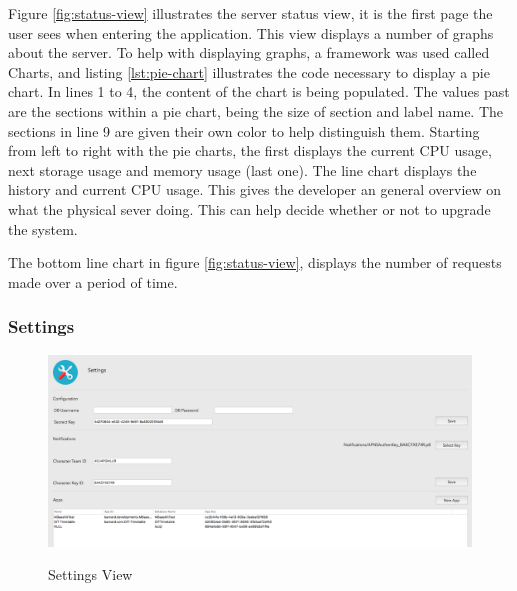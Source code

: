 Figure \ref{fig:status-view} illustrates the server status view, it is the first page the user sees when entering the application. This view displays a number of graphs about the server. To help with displaying graphs, a framework was used called Charts, and listing \ref{lst:pie-chart} illustrates the code necessary to display a pie chart. In lines 1 to 4, the content of the chart is being populated. The values past are the sections within a pie chart, being the size of section and label name. The sections in line 9 are given their own color to help distinguish them.
Starting from left to right with the pie charts, the first displays the current CPU usage, next storage usage and memory usage (last one). The line chart displays the history and current CPU usage. This gives the developer an general overview on what the physical sever doing. This can help decide whether or not to upgrade the system.


The bottom line chart in figure \ref{fig:status-view}, displays the number of requests made over a period of time.

\subsubsection{Settings}

\begin{figure}[!h]
    \caption{Settings View}
    \centering
    \includegraphics[width=150mm]{images/dashboard/settings}
    \label{fig:settings-view}
\end{figure} 


